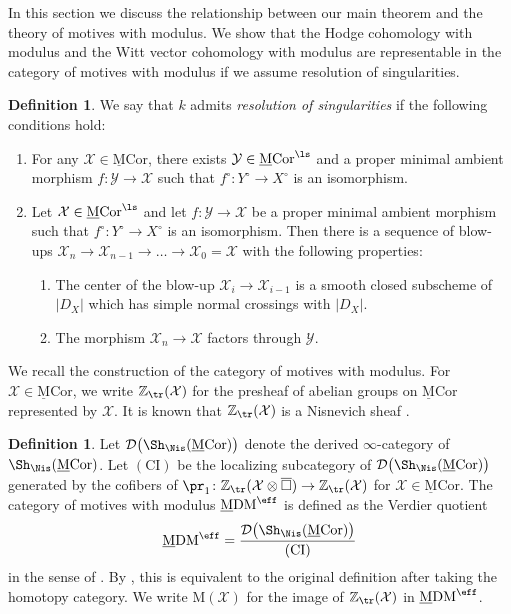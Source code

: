 \documentclass{amsart}
\theoremstyle{plain}
\theoremstyle{definition}
\newtheorem{definition}[theorem]{Definition}
\theoremstyle{remark}
\numberwithin{equation}{section}
\def\bcube{{\overline{\square}}}
\def\MCor{\mathrm{\underline{M}Cor}}
\def\MDM{\mathrm{\underline{M}DM}}
\begin{document}
In this section we discuss the relationship between our main theorem and the theory of motives with modulus.
We show that the Hodge cohomology with modulus and the Witt vector cohomology with modulus are representable in the category of motives with modulus if we assume resolution of singularities.
\begin{definition}\label{def:resolution}
	We say that $k$ admits \emph{resolution of singularities} if the following conditions hold:
	\begin{enumerate}
            \item[(RS1)]
            For any $\mathcal{X}\in \MCor$, there exists $\mathcal{Y}\in \MCor^\ls$ and a proper minimal ambient morphism $f\colon \mathcal{Y}\to \mathcal{X}$ such that $f^\circ\colon Y^\circ\to X^\circ$ is an isomorphism.
            \item[(RS2)]
            Let $\mathcal{X}\in \MCor^\ls$ and let $f\colon \mathcal{Y}\to \mathcal{X}$ be a proper minimal ambient morphism such that $f^\circ\colon Y^\circ\to X^\circ$ is an isomorphism.
            Then there is a sequence of blow-ups $\mathcal{X}_n\to \mathcal{X}_{n-1}\to\dots\to \mathcal{X}_0=\mathcal{X}$ with the following properties:
            \begin{enumerate}
                \item The center of the blow-up $\mathcal{X}_i\to \mathcal{X}_{i-1}$ is a smooth closed subscheme of $|D_X|$ which has simple normal crossings with $|D_X|$.
                \item The morphism $\mathcal{X}_n\to \mathcal{X}$ factors through $\mathcal{Y}$.
            \end{enumerate}
	\end{enumerate}
\end{definition}


We recall the construction of the category of motives with modulus.
For $\mathcal{X}\in \MCor$, we write $\mathbb{Z}_\tr(\mathcal{X})$ for the presheaf of abelian groups on $\MCor$ represented by $\mathcal{X}$.
It is known that $\mathbb{Z}_\tr(\mathcal{X})$ is a Nisnevich sheaf \cite[Proposition 3.3.5]{KMSY1}.

\begin{definition}
    Let $\mathcal{D}\bigl(\Sh_\Nis(\MCor)\bigr)$ denote the derived $\infty$-category of $\Sh_\Nis(\MCor)$.
    Let $(\mathrm{CI})$ be the localizing subcategory of $\mathcal{D}\bigl(\Sh_\Nis(\MCor)\bigr)$ generated by the cofibers of $\pr_1\colon \mathbb{Z}_\tr(\mathcal{X}\otimes \bcube)\to \mathbb{Z}_\tr(\mathcal{X})$ for $\mathcal{X}\in \MCor$.
	The category of motives with modulus $\MDM^\eff$ is defined as the Verdier quotient
	$$
		\MDM^\eff = \frac{\mathcal{D}\bigl(\Sh_\Nis(\MCor)\bigr)}{(\mathrm{CI})}
	$$
	in the sense of \cite[Definition 5.4]{BGT}.
	By \cite[Theorem 4.1.1]{KMSY3}, this is equivalent to the original definition \cite[Definition 3.2.4]{KMSY3} after taking the homotopy category.
    We write $\mathrm{M}(\mathcal{X})$ for the image of $\mathbb{Z}_\tr(\mathcal{X})$ in $\MDM^\eff$.
\end{definition}
\end{document}
